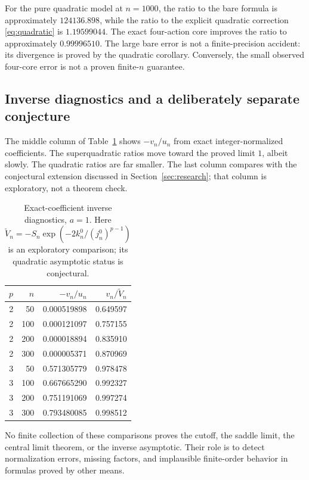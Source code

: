 \documentclass[11pt,a4paper]{article}
\numberwithin{equation}{section}
\theoremstyle{definition}
\theoremstyle{remark}
\begin{document}
For the pure quadratic model at $n=1000$, the ratio to the bare formula is
approximately $124136.898$, while the ratio to the explicit quadratic
correction \eqref{eq:quadratic} is $1.19599044$. The exact four-action
core improves the ratio to approximately $0.99996510$.
The large bare error is not a finite-precision accident: its divergence is
proved by the quadratic corollary. Conversely, the small observed
four-core error is not a proven finite-$n$ guarantee.

\subsection{Inverse diagnostics and a deliberately separate conjecture}

The middle column of Table~\ref{tab:inverse} shows $-v_n/u_n$ from exact
integer-normalized coefficients. The superquadratic ratios move toward the
proved limit $1$, albeit slowly. The quadratic ratios are far smaller.
The last column compares with the conjectural extension discussed in
Section~\ref{sec:research}; that column is exploratory, not a theorem check.

\begin{table}[htbp]
\centering
\caption{Exact-coefficient inverse diagnostics, $a=1$. Here
$\widetilde V_n=-S_n\exp(-2k_n^0/(j_n^0)^{p-1})$ is an exploratory
comparison; its quadratic asymptotic status is conjectural.}
\label{tab:inverse}
\begin{tabular}{rrrr}
\toprule
$p$ & $n$ & $-v_n/u_n$ & $v_n/\widetilde V_n$\\
\midrule
2 & 50 & 0.000519898 & 0.649597 \\
2 & 100 & 0.000121097 & 0.757155 \\
2 & 200 & 0.000018894 & 0.835910 \\
2 & 300 & 0.000005371 & 0.870969 \\
3 & 50 & 0.571305779 & 0.978478 \\
3 & 100 & 0.667665290 & 0.992327 \\
3 & 200 & 0.751191069 & 0.997274 \\
3 & 300 & 0.793480085 & 0.998512 \\
\bottomrule
\end{tabular}
\end{table}

No finite collection of these comparisons proves the cutoff, the saddle
limit, the central limit theorem, or the inverse asymptotic. Their role is
to detect normalization errors, missing factors, and implausible finite-order
behavior in formulas proved by other means.
\end{document}
